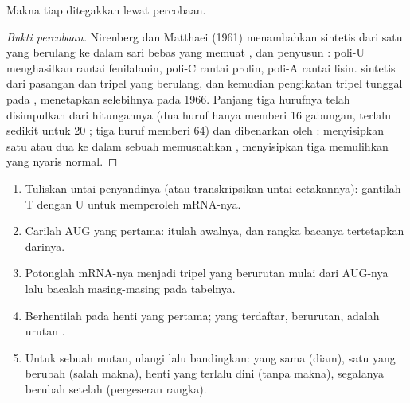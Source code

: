\begin{proposition}\label{prop:g11:gene-expression:readcode}
Makna tiap  ditegakkan lewat percobaan.
\end{proposition}
\begin{proof}[Bukti percobaan]
Nirenberg dan Matthaei (1961) menambahkan  sintetis dari satu
 yang berulang ke dalam sari bebas  yang memuat ,
 dan  penyusun : poli-U menghasilkan rantai
fenilalanin, poli-C rantai prolin, poli-A rantai lisin.  sintetis
dari pasangan dan tripel yang berulang, dan kemudian pengikatan tripel
tunggal pada , menetapkan  selebihnya pada 1966. Panjang
tiga hurufnya telah disimpulkan dari hitungannya (dua huruf hanya
memberi 16 gabungan, terlalu sedikit untuk 20 ; tiga huruf
memberi 64) dan dibenarkan oleh : menyisipkan satu atau dua
 ke dalam sebuah  memusnahkan , menyisipkan tiga
memulihkan  yang nyaris normal.
\end{proof}

\begin{method}\label{met:g11:gene-expression:translate}
\begin{enumerate}
  \item Tuliskan untai penyandinya (atau transkripsikan untai
        cetakannya): gantilah T dengan U untuk memperoleh mRNA-nya.
  \item Carilah AUG yang pertama: itulah awalnya, dan rangka bacanya
        tertetapkan darinya.
  \item Potonglah mRNA-nya menjadi tripel yang berurutan mulai dari
        AUG-nya lalu bacalah masing-masing pada tabelnya.
  \item Berhentilah pada  henti yang pertama;  yang
        terdaftar, berurutan, adalah urutan .
  \item Untuk sebuah mutan, ulangi lalu bandingkan:  yang sama
        (diam), satu  yang berubah (salah makna), henti yang
        terlalu dini (tanpa makna), segalanya berubah setelah 
        (pergeseran rangka).
\end{enumerate}
\end{method}

